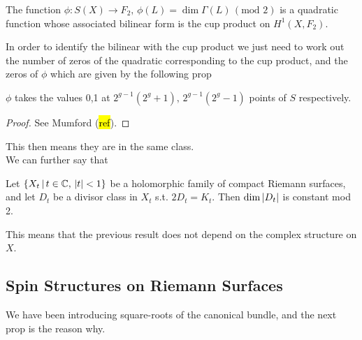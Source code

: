 \documentclass{article}
\begin{document}
\begin{theorem}
	The function $\phi:S(X) \to F_2, \, \phi(L) = \dim \Gamma(L) \, (\text{mod } 2)$ is a quadratic function whose associated bilinear form is the cup product on $H^1(X,F_2)$. 
\end{theorem}
In order to identify the bilinear with the cup product we just need to work out the number of zeros of the quadratic corresponding to the cup product, and the zeros of $\phi$ which are given by the following prop
\begin{prop}
	$\phi$ takes the values 0,1 at $2^{g-1}(2^g+1), \, 2^{g-1}(2^g-1)$ points of $S$ respectively. 
\end{prop}
\begin{proof}
	See Mumford (\hl{ref}).
\end{proof}
This then means they are in the same class. \\
We can further say that 
\begin{theorem}
	Let $\left\{ X_t \, | \, t \in \mathbb{C}, \, \left\lvert t \right\rvert<1 \right\}$ be a holomorphic family of compact Riemann surfaces, and let $D_t$ be a divisor class in $X_t$ s.t. $2D_t = K_t$. Then $\dim \left\lvert D_t \right\rvert$ is constant mod 2.  
\end{theorem}
This means that the previous result does not depend on the complex structure on $X$. 

\subsection{Spin Structures on Riemann Surfaces}
We have been introducing square-roots of the canonical bundle, and the next prop is the reason why. 


\end{document}
